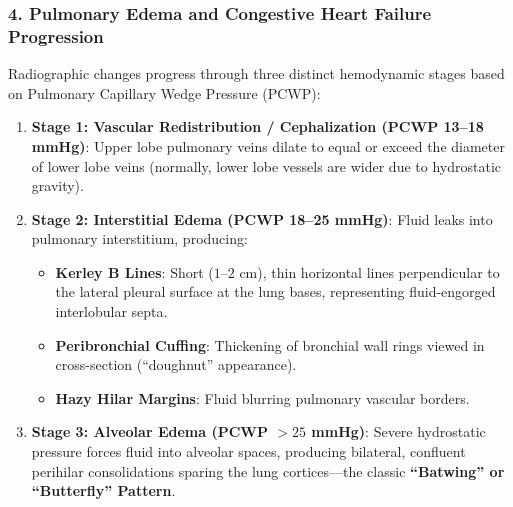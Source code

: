 \documentclass[11pt,a4paper]{article}
\begin{document}
\subsubsection{4. Pulmonary Edema and Congestive Heart Failure Progression}
Radiographic changes progress through three distinct hemodynamic stages based on Pulmonary Capillary Wedge Pressure (PCWP):
\begin{enumerate}
    \item \textbf{Stage 1: Vascular Redistribution / Cephalization (PCWP 13--18 mmHg)}: Upper lobe pulmonary veins dilate to equal or exceed the diameter of lower lobe veins (normally, lower lobe vessels are wider due to hydrostatic gravity).
    \item \textbf{Stage 2: Interstitial Edema (PCWP 18--25 mmHg)}: Fluid leaks into pulmonary interstitium, producing:
    \begin{itemize}
        \item \textbf{Kerley B Lines}: Short ($1\text{--}2\text{ cm}$), thin horizontal lines perpendicular to the lateral pleural surface at the lung bases, representing fluid-engorged interlobular septa.
        \item \textbf{Peribronchial Cuffing}: Thickening of bronchial wall rings viewed in cross-section (``doughnut'' appearance).
        \item \textbf{Hazy Hilar Margins}: Fluid blurring pulmonary vascular borders.
    \end{itemize}
    \item \textbf{Stage 3: Alveolar Edema (PCWP $>25$ mmHg)}: Severe hydrostatic pressure forces fluid into alveolar spaces, producing bilateral, confluent perihilar consolidations sparing the lung cortices—the classic \textbf{``Batwing'' or ``Butterfly'' Pattern}.
\end{enumerate}
\end{document}
